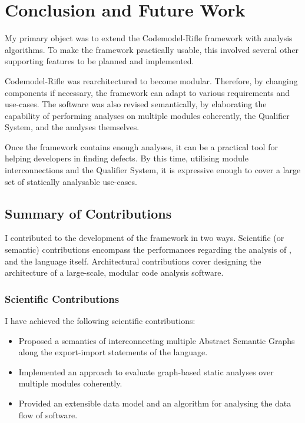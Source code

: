 \chapter{Conclusion and Future Work}
\label{chapter:conclusion}

My primary object was to extend the Codemodel-Rifle framework with analysis algorithms. To make the framework practically usable, this involved several other supporting features to be planned and implemented.

Codemodel-Rifle was rearchitectured to become modular. Therefore, by changing components if necessary, the framework can adapt to various requirements and use-cases. The software was also revised semantically, by elaborating the capability of performing analyses on multiple modules coherently, the Qualifier System, and the analyses themselves.

Once the framework contains enough analyses, it can be a practical tool for helping developers in finding defects. By this time, utilising module interconnections and the Qualifier System, it is expressive enough to cover a large set of statically analysable use-cases.


\section{Summary of Contributions}

I contributed to the development of the framework in two ways. Scientific (or semantic) contributions encompass the performances regarding the analysis of \es, and the language itself. Architectural contributions cover designing the architecture of a large-scale, modular code analysis software.


\subsection{Scientific Contributions}

I have achieved the following scientific contributions:

\begin{itemize}
\item Proposed a semantics of interconnecting multiple Abstract Semantic Graphs along the export-import statements of the \es language.
\item Implemented an approach to evaluate graph-based static analyses over multiple \es modules coherently.
\item Provided an extensible data model and an algorithm for analysing the data flow of \es software.
\end{itemize}



